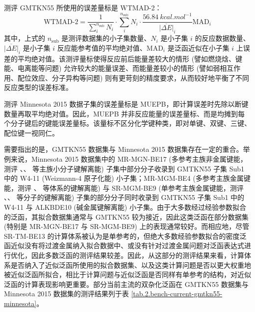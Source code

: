 测评 GMTKN55 所使用的误差量标是 WTMAD-2：
\begin{equation}
  \text{WTMAD-2} = \frac{1}{\sum_{i}^{n_\mathrm{sub}} N_i} \cdot \sum_{i}^{n_\mathrm{sub}} N_i \cdot \frac{\SI{56.84}{kcal.mol^{-1}}}{\overline{|\Delta E|}_i} \text{MAD}_i
\end{equation}
其中，上式的 $n_\mathrm{sub}$ 是测评数据集的小子集数量、$N_i$ 是小子集 $i$ 的反应数据数量、$\overline{|\Delta E|}_i$ 是小子集 $i$ 反应能参考值的平均绝对值、$\text{MAD}_i$ 是泛函近似在小子集 $i$ 上误差的平均绝对值。该测评量标使得反应前后能量差较大的情形 (譬如燃烧焓、键能、电离能等问题) 允许较大的能量误差、而能量差较小的情形 (譬如弱相互作用、配位效应、分子异构等问题) 则有更苛刻的精度要求，从而较好地平衡了不同反应类型的误差标准。

测评 Minnesota 2015 数据子集的误差量标是 MUEPB，即计算误差时先除以断键数量再取平均绝对值。因此，MUEPB 并非反应能量的误差量标、而是均摊到每个分子键后的键能误差量标。该量标不区分化学键种类，即对单键、双键、三键、配位键一视同仁。

需要指出的是，GMTKN55 数据集与 Minnesota 2015 数据集存在一定的重合。举例来说，Minnesota 2015 数据集中的 MR-MGN-BE17 (多参考主族非金属键能，测评 、、 等主族小分子键解离能) 子集中部分分子收录到 GMTKN55 子集 Sub1 中的 W4-11 (Weizmann-4 原子化能) 小子集；MR-MGM-BE4 (多参考主族金属键能，测评 、 等体系的键解离能) 与 SR-MGM-BE9 (单参考主族金属键能，测评 、、 等分子的键解离能) 子集的部分分子同时收录到 GMTKN55 子集 Sub1 中的 W4-11 与 ALKBDE10 (碱金属键解离能) 小子集。由于大多数经过经验参数拟合的泛函，其拟合数据集通常与 GMTKN55 较为接近，因此这类泛函在部分数据集 (特别是 MR-MGN-BE17 与 SR-MGM-BE9) 上的表现通常较好。而相应地，尽管 SR-TM-BE13 的计算体系被认为是单参考的，但绝大多数经验参数拟合的密度泛函近似没有将过渡金属纳入拟合数据中、或没有针对过渡金属问题对泛函表达式进行优化，因此多数泛函的测评结果较差。因此，从这部分的测评结果来看，计算体系是否纳入了近似泛函所使用的拟合数据集、以及这类计算问题是否以更大权重地被近似泛函所拟合，相比于计算问题与近似泛函是否同样有单参考的结构，对近似泛函的计算表现影响更重要。部分当前主流的双杂化泛函在 GMTKN55 数据集与 Minnesota 2015 数据集的测评结果列于表 \ref{tab.2.bench-current-gmtkn55-minnesota}。

